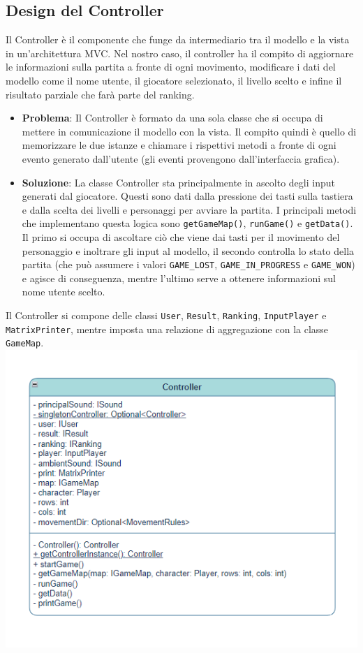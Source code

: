 \documentclass[12pt, letterpaper]{article}
\begin{document}
    \subsection{Design del Controller}
        Il Controller è il componente che funge da intermediario tra il modello e la vista in un'architettura MVC. Nel nostro caso, il controller ha il compito di aggiornare le informazioni sulla partita a fronte di ogni movimento, modificare i dati del modello come il nome utente, il giocatore selezionato, il livello scelto e infine il risultato parziale che farà parte del ranking.
        \begin{itemize}
            \item \textbf{Problema}: Il Controller è formato da una sola classe che si occupa di mettere in comunicazione il modello con la vista. Il compito quindi è quello di memorizzare le due istanze e chiamare i rispettivi metodi a fronte di ogni evento generato dall'utente (gli eventi provengono dall'interfaccia grafica).
            \item \textbf{Soluzione}: La classe Controller sta principalmente in ascolto degli input generati dal giocatore. Questi sono dati dalla pressione dei tasti sulla tastiera e dalla scelta dei livelli e personaggi per avviare la partita. I principali metodi che implementano questa logica sono \texttt{getGameMap()}, \texttt{runGame()} e \texttt{getData()}. Il primo si occupa di ascoltare ciò che viene dai tasti per il movimento del personaggio e inoltrare gli input al modello, il secondo controlla lo stato della partita (che può assumere i valori \texttt{GAME\_LOST}, \texttt{GAME\_IN\_PROGRESS} e \texttt{GAME\_WON}) e agisce di conseguenza, mentre l'ultimo serve a ottenere informazioni sul nome utente scelto.
            \end{itemize}
            Il Controller si compone delle classi \texttt{User}, \texttt{Result}, \texttt{Ranking}, \texttt{InputPlayer} e \texttt{MatrixPrinter}, mentre imposta una relazione di aggregazione con la classe \texttt{GameMap}.
            \\
            \includegraphics[width=1\textwidth]{controller.png}
\end{document}
